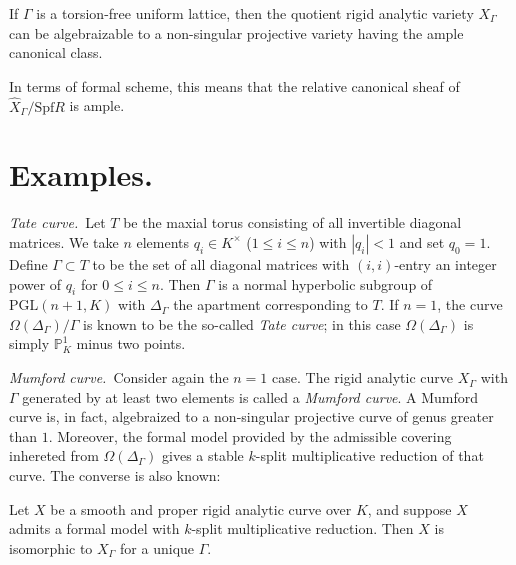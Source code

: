 \begin{appthm}
If $\Gamma$ is a torsion-free uniform lattice, then the quotient rigid
analytic variety $X_{\Gamma}$ can be algebraizable to a non-singular
projective variety having the ample canonical class.
\end{appthm}

In terms of formal scheme, this means that the relative canonical sheaf
of $\widehat{X}_{\Gamma}/\mathrm{Spf}R$ is ample.

%
\section{Examples.}

{\it Tate curve.}\ 
Let $T$ be the maxial torus consisting of all invertible diagonal
matrices. We take $n$ elements $q_i\in K^{\times}$ ($1\leq i\leq n$)
with $|q_i|<1$ and set $q_0=1$.
Define $\Gamma\subset T$ to be the set of all diagonal matrices with
$(i,i)$-entry an integer power of $q_i$ for $0\leq i\leq n$.
Then $\Gamma$ is a normal hyperbolic subgroup of $\mathrm{PGL}(n+1,K)$
with $\Delta_{\Gamma}$ the apartment corresponding to $T$.
If $n=1$, the curve $\Omega(\Delta_{\Gamma})/\Gamma$ is known to be 
the so-called {\it Tate curve}; in this case
$\Omega(\Delta_{\Gamma})$ is simply $\mathbb{P}^1_K$ minus two points.

\vspace{1ex}
{\it Mumford curve.}\ 
Consider again the $n=1$ case.
The rigid analytic curve $X_{\Gamma}$ with $\Gamma$ generated by at
least two elements is called a {\it Mumford curve}.
A Mumford curve is, in fact, algebraized to a non-singular projective
curve of genus greater than $1$.
Moreover, the formal model provided by the admissible covering inhereted 
from $\Omega(\Delta_{\Gamma})$ gives a stable $k$-split multiplicative
reduction of that curve.
The converse is also known:

\begin{appthm}
Let $X$ be a smooth and proper rigid analytic curve over $K$, and
suppose $X$ admits a formal model with $k$-split multiplicative
reduction. Then $X$ is isomorphic to $X_{\Gamma}$ for a unique 
$\Gamma$.
\end{appthm}

